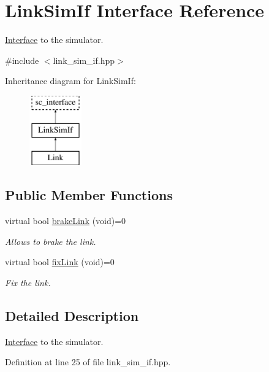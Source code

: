 \hypertarget{classLinkSimIf}{\section{Link\-Sim\-If Interface Reference}
\label{classLinkSimIf}
}


\hyperlink{classInterface}{Interface} to the simulator.  




{\ttfamily \#include $<$link\-\_\-sim\-\_\-if.\-hpp$>$}

Inheritance diagram for Link\-Sim\-If\-:\begin{figure}[H]
\begin{center}
\leavevmode
\includegraphics[height=3.000000cm]{classLinkSimIf}
\end{center}
\end{figure}
\subsection*{Public Member Functions}
\begin{DoxyCompactItemize}
\item 
virtual bool \hyperlink{classLinkSimIf_a071cb3d3cbfbac72bc8c473aaafcf83b}{brake\-Link} (void)=0
\begin{DoxyCompactList}\small\item\em Allows to brake the link. \end{DoxyCompactList}\item 
virtual bool \hyperlink{classLinkSimIf_aadbf498d9c332b27745b92fea4137728}{fix\-Link} (void)=0
\begin{DoxyCompactList}\small\item\em Fix the link. \end{DoxyCompactList}\end{DoxyCompactItemize}


\subsection{Detailed Description}
\hyperlink{classInterface}{Interface} to the simulator. 

Definition at line 25 of file link\-\_\-sim\-\_\-if.\-hpp.



